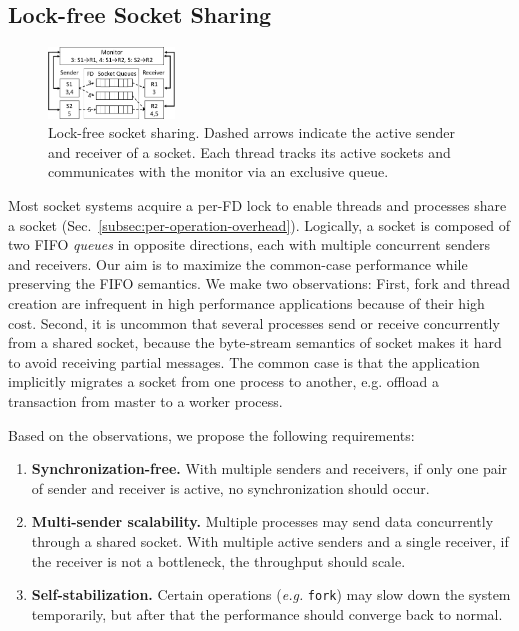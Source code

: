 \subsection{Lock-free Socket Sharing}
\label{subsec:fork}


\begin{figure}[t!]
	\centering
	\includegraphics[width=0.3\textwidth]{images/queue_arch}
	\vspace{-5pt}
	\caption{Lock-free socket sharing. Dashed arrows indicate the active sender and receiver of a socket. Each thread tracks its active sockets and communicates with the monitor via an exclusive queue.}
	\label{fig:queue-arch}
\end{figure}

Most socket systems acquire a per-FD lock to enable threads and processes share a socket (Sec.~\ref{subsec:per-operation-overhead}).
Logically, a socket is composed of two FIFO \emph{queues} in opposite directions, each with multiple concurrent senders and receivers.
Our aim is to maximize the common-case performance while preserving the FIFO semantics.
We make two observations: First, fork and thread creation are infrequent in high performance applications because of their high cost.
Second, it is uncommon that several processes send or receive concurrently from a shared socket, because the byte-stream semantics of socket makes it hard to avoid receiving partial messages.
The common case is that the application implicitly migrates a socket from one process to another, e.g. offload a transaction from master to a worker process.

\iffalse
Based on the observations, we propose the following requirements:

\begin{enumerate}
 \item \textbf{Synchronization-free.} With multiple senders and receivers, if only one pair of sender and receiver is active, no synchronization should occur.
 \item \textbf{Multi-sender scalability.} Multiple processes may send data concurrently through a shared socket. With multiple active senders and a single receiver, if the receiver is not a bottleneck, the throughput should scale.
 \item \textbf{Self-stabilization.} Certain operations (\textit{e.g.} \texttt{fork}) may slow down the system temporarily, but after that the performance should converge back to normal.
\end{enumerate}

